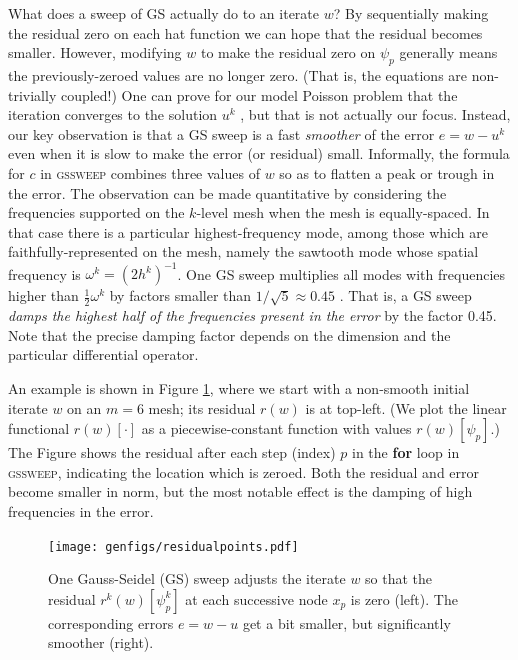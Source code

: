 \documentclass[letterpaper,final,12pt,reqno]{amsart}
\begin{document}
What does a sweep of GS actually do to an iterate $w$?  By sequentially making the residual zero on each hat function we can hope that the residual becomes smaller.  However, modifying $w$ to make the residual zero on $\psi_p$ generally means the previously-zeroed values are no longer zero.  (That is, the equations are non-trivially coupled!)  One can prove for our model Poisson problem that the iteration converges to the solution $u^k$ \cite[for example]{Greenbaum1997}, but that is not actually our focus.  Instead, our key observation is that a GS sweep is a fast \emph{smoother} of the error $e=w-u^k$ even when it is slow to make the error (or residual) small.  Informally, the formula for $c$ in \textsc{gssweep} combines three values of $w$ so as to flatten a peak or trough in the error.  The observation can be made quantitative by considering the frequencies supported on the $k$-level mesh when the mesh is equally-spaced.  In that case there is a particular highest-frequency mode, among those which are faithfully-represented on the mesh, namely the sawtooth mode whose spatial frequency is $\omega^k=(2h^k)^{-1}$.  One GS sweep multiplies all modes with frequencies higher than $\frac{1}{2} \omega^k$ by factors smaller than $1/\sqrt{5}\approx 0.45$ \cite[Chapter 4]{Briggsetal2000}.  That is, a GS sweep \emph{damps the highest half of the frequencies present in the error} by the factor 0.45.  Note that the precise damping factor depends on the dimension and the particular differential operator.

An example is shown in Figure \ref{fig:residualpoints}, where we start with a non-smooth initial iterate $w$ on an $m=6$ mesh; its residual $r(w)$ is at top-left.  (We plot the linear functional $r(w)[\cdot]$ as a piecewise-constant function with values $r(w)[\psi_p]$.)  The Figure shows the residual after each step (index) $p$ in the \textbf{for} loop in \textsc{gssweep}, indicating the location which is zeroed.  Both the residual and error become smaller in norm, but the most notable effect is the damping of high frequencies in the error.

\begin{figure}
\texttt{[image: genfigs/residualpoints.pdf]}
\caption{One Gauss-Seidel (GS) sweep adjusts the iterate $w$ so that the residual $r^k(w)[\psi_p^k]$ at each successive node $x_p$ is zero (left).  The corresponding errors $e=w-u$ get a bit smaller, but significantly smoother (right).}
\label{fig:residualpoints}
\end{figure}
\end{document}
